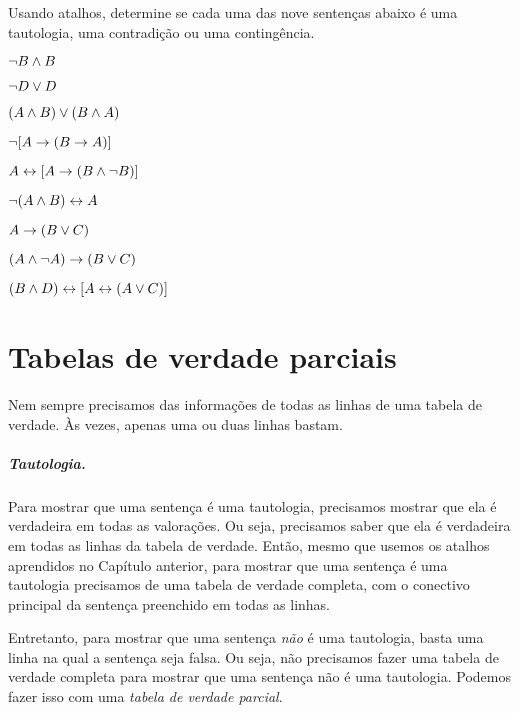 \practiceproblems
\problempart
\label{pr.TT.TTorC2}
Usando atalhos, determine se cada uma das nove sentenças abaixo é uma tautologia, uma contradição ou uma contingência.
\begin{earg}
\item $\neg B \wedge B$ %
\item $\neg D \vee D$ %
\item $(A\wedge B) \vee (B\wedge A)$ %
\item $\neg[A \rightarrow (B \rightarrow A)]$ %
\item $A \leftrightarrow [A \rightarrow (B \wedge \neg B)]$ %
\item $\neg(A\wedge B) \leftrightarrow A$ %
\item $A\rightarrow(B\vee C)$ %
\item $(A \wedge\neg A) \rightarrow (B \vee C)$ %
\item $(B\wedge D) \leftrightarrow [A \leftrightarrow(A \vee C)]$%
\end{earg}


\chapter{Tabelas de verdade parciais}\label{s:PartialTruthTable}

Nem sempre precisamos das informações de todas as linhas de uma tabela de verdade.
Às vezes, apenas uma ou duas linhas bastam.

\paragraph{Tautologia.} 
Para mostrar que uma sentença é uma tautologia, precisamos mostrar que ela é verdadeira em todas as valorações.
Ou seja, precisamos saber que ela é verdadeira em todas as linhas da tabela de verdade.
Então, mesmo que usemos os atalhos aprendidos no Capítulo anterior, para mostrar que uma sentença é uma tautologia precisamos de uma tabela de verdade completa, com o conectivo principal da sentença preenchido em todas as linhas.

Entretanto, para mostrar que uma sentença \emph{não} é uma tautologia, basta uma linha na qual a sentença seja falsa.
Ou seja, não precisamos fazer uma tabela de verdade completa para mostrar que uma sentença não é uma tautologia.
Podemos fazer isso  com uma \emph{tabela de verdade parcial}.

